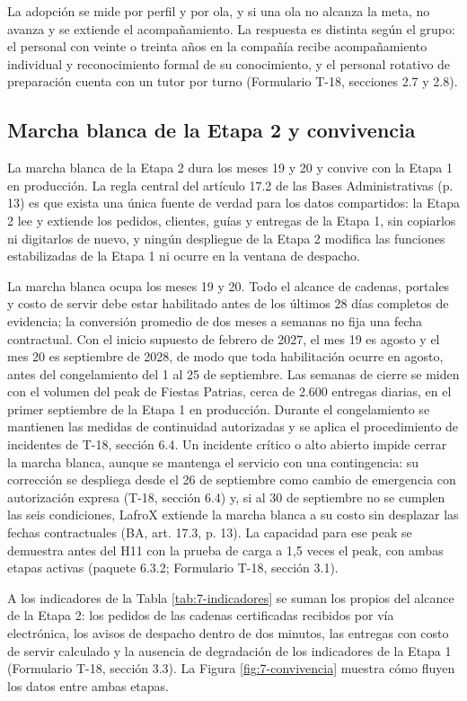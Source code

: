 La adopción se mide por perfil y por ola, y si una ola no alcanza la meta, no avanza y se extiende el acompañamiento. La respuesta es distinta según el grupo: el personal con veinte o treinta años en la compañía recibe acompañamiento individual y reconocimiento formal de su conocimiento, y el personal rotativo de preparación cuenta con un tutor por turno (Formulario T-18, secciones 2.7 y 2.8).

\subsection{Marcha blanca de la Etapa 2 y convivencia}

La marcha blanca de la Etapa 2 dura los meses 19 y 20 y convive con la Etapa 1 en producción. La regla central del artículo 17.2 de las Bases Administrativas (p. 13) es que exista una única fuente de verdad para los datos compartidos: la Etapa 2 lee y extiende los pedidos, clientes, guías y entregas de la Etapa 1, sin copiarlos ni digitarlos de nuevo, y ningún despliegue de la Etapa 2 modifica las funciones estabilizadas de la Etapa 1 ni ocurre en la ventana de despacho.

La marcha blanca ocupa los meses 19 y 20. Todo el alcance de cadenas, portales y costo de servir debe estar habilitado antes de los últimos 28 días completos de evidencia; la conversión promedio de dos meses a semanas no fija una fecha contractual. Con el inicio supuesto de febrero de 2027, el mes 19 es agosto y el mes 20 es septiembre de 2028, de modo que toda habilitación ocurre en agosto, antes del congelamiento del 1 al 25 de septiembre. Las semanas de cierre se miden con el volumen del peak de Fiestas Patrias, cerca de 2.600 entregas diarias, en el primer septiembre de la Etapa 1 en producción. Durante el congelamiento se mantienen las medidas de continuidad autorizadas y se aplica el procedimiento de incidentes de T-18, sección 6.4. Un incidente crítico o alto abierto impide cerrar la marcha blanca, aunque se mantenga el servicio con una contingencia: su corrección se despliega desde el 26 de septiembre como cambio de emergencia con autorización expresa (T-18, sección 6.4) y, si al 30 de septiembre no se cumplen las seis condiciones, LafroX extiende la marcha blanca a su costo sin desplazar las fechas contractuales (BA, art. 17.3, p. 13). La capacidad para ese peak se demuestra antes del H11 con la prueba de carga a 1,5 veces el peak, con ambas etapas activas (paquete 6.3.2; Formulario T-18, sección 3.1).

A los indicadores de la Tabla \ref{tab:7-indicadores} se suman los propios del alcance de la Etapa 2: los pedidos de las cadenas certificadas recibidos por vía electrónica, los avisos de despacho dentro de dos minutos, las entregas con costo de servir calculado y la ausencia de degradación de los indicadores de la Etapa 1 (Formulario T-18, sección 3.3). La Figura \ref{fig:7-convivencia} muestra cómo fluyen los datos entre ambas etapas.

